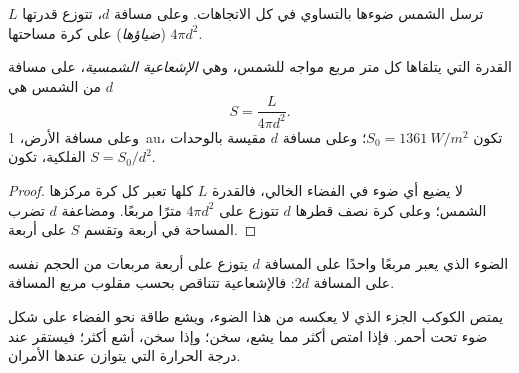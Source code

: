 ترسل الشمس ضوءها بالتساوي في كل الاتجاهات. وعلى مسافة $d$، تتوزع قدرتها $L$
(\emph{ضياؤها}) على كرة مساحتها $4\pi d^2$.

\begin{proposition}\label{prop:g10:habitable-planet:inverse-square}
القدرة التي يتلقاها كل متر مربع مواجه للشمس، وهي \emph{الإشعاعية
الشمسية}، على مسافة $d$ من الشمس هي
\[
  S = \frac{L}{4\pi d^2}.
\]
وعلى مسافة الأرض، \qty{1}{au}، تكون $S_0 = \qty{1361}{W/m^2}$؛ وعلى
مسافة $d$ مقيسة بالوحدات الفلكية، تكون $S = S_0/d^2$.
\end{proposition}

\begin{proof}
لا يضيع أي ضوء في الفضاء الخالي، فالقدرة $L$ كلها تعبر كل كرة مركزها الشمس؛
وعلى كرة نصف قطرها $d$ تتوزع على $4\pi d^2$ مترًا مربعًا. ومضاعفة $d$ تضرب
المساحة في أربعة وتقسم $S$ على
أربعة.
\end{proof}

\begin{omfigure}

{\small الضوء الذي يعبر مربعًا واحدًا على المسافة $d$ يتوزع على أربعة مربعات
من الحجم نفسه على المسافة $2d$: فالإشعاعية تتناقص بحسب مقلوب مربع
المسافة.}
\end{omfigure}

يمتص الكوكب الجزء الذي لا يعكسه من هذا الضوء، ويشع طاقة نحو الفضاء على شكل ضوء
تحت أحمر. فإذا امتص أكثر مما يشع، سخن؛ وإذا سخن، أشع أكثر؛ فيستقر عند درجة
الحرارة التي يتوازن عندها الأمران.

